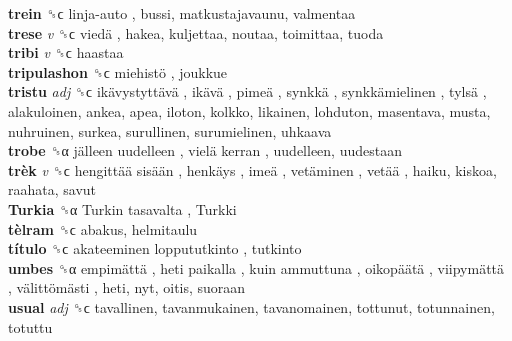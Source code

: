 \textbf{trein} ␝ϲ   linja-auto , bussi, matkustajavaunu, valmentaa  \\
\textbf{trese} \emph{v}  ␝ϲ   viedä , hakea, kuljettaa, noutaa, toimittaa, tuoda  \\
\textbf{tribi} \emph{v}  ␝ϲ  haastaa  \\
\textbf{tripulashon} ␝ϲ   miehistö , joukkue  \\
\textbf{tristu} \emph{adj}  ␝ϲ   ikävystyttävä ,  ikävä ,  pimeä ,  synkkä ,  synkkämielinen ,  tylsä , alakuloinen, ankea, apea, iloton, kolkko, likainen, lohduton, masentava, musta, nuhruinen, surkea, surullinen, surumielinen, uhkaava  \\
\textbf{trobe} ␝α   jälleen uudelleen ,  vielä kerran , uudelleen, uudestaan  \\
\textbf{trèk} \emph{v}  ␝ϲ   hengittää sisään ,  henkäys ,  imeä ,  vetäminen ,  vetää , haiku, kiskoa, raahata, savut  \\
\textbf{Turkia} ␝α   Turkin tasavalta ,  Turkki   \\
\textbf{tèlram} ␝ϲ  abakus, helmitaulu  \\
\textbf{título} ␝ϲ   akateeminen loppututkinto , tutkinto  \\
\textbf{umbes} ␝α   empimättä ,  heti paikalla ,  kuin ammuttuna ,  oikopäätä ,  viipymättä ,  välittömästi , heti, nyt, oitis, suoraan  \\
\textbf{usual} \emph{adj}  ␝ϲ  tavallinen, tavanmukainen, tavanomainen, tottunut, totunnainen, totuttu  \\
